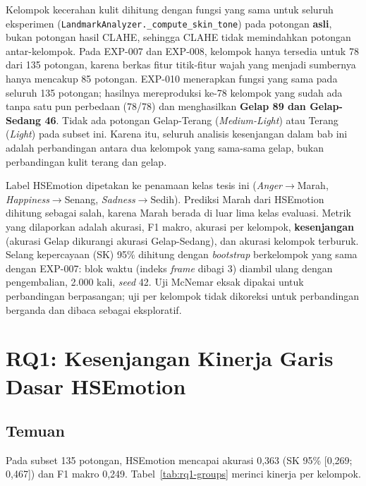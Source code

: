 Kelompok kecerahan kulit dihitung dengan fungsi yang sama untuk seluruh eksperimen (\texttt{LandmarkAnalyzer.\_compute\_skin\_tone}) pada potongan \textbf{asli}, bukan potongan hasil CLAHE, sehingga CLAHE tidak memindahkan potongan antar-kelompok. Pada EXP-007 dan EXP-008, kelompok hanya tersedia untuk 78 dari 135 potongan, karena berkas fitur titik-fitur wajah yang menjadi sumbernya hanya mencakup 85 potongan. EXP-010 menerapkan fungsi yang sama pada seluruh 135 potongan; hasilnya mereproduksi ke-78 kelompok yang sudah ada tanpa satu pun perbedaan (78/78) dan menghasilkan \textbf{Gelap 89 dan Gelap-Sedang 46}. Tidak ada potongan Gelap-Terang (\textit{Medium-Light}) atau Terang (\textit{Light}) pada subset ini. Karena itu, seluruh analisis kesenjangan dalam bab ini adalah perbandingan antara dua kelompok yang sama-sama gelap, bukan perbandingan kulit terang dan gelap.

Label HSEmotion dipetakan ke penamaan kelas tesis ini (\textit{Anger}$\to$Marah, \textit{Happiness}$\to$Senang, \textit{Sadness}$\to$Sedih). Prediksi Marah dari HSEmotion dihitung sebagai salah, karena Marah berada di luar lima kelas evaluasi. Metrik yang dilaporkan adalah akurasi, F1 makro, akurasi per kelompok, \textbf{kesenjangan} (akurasi Gelap dikurangi akurasi Gelap-Sedang), dan akurasi kelompok terburuk. Selang kepercayaan (SK) 95\% dihitung dengan \textit{bootstrap} berkelompok yang sama dengan EXP-007: blok waktu (indeks \textit{frame} dibagi 3) diambil ulang dengan pengembalian, 2.000 kali, \textit{seed} 42. Uji McNemar eksak dipakai untuk perbandingan berpasangan; uji per kelompok tidak dikoreksi untuk perbandingan berganda dan dibaca sebagai eksploratif.

\section{RQ1: Kesenjangan Kinerja Garis Dasar HSEmotion}
\label{sec:rq1-results}

\subsection*{Temuan}

Pada subset 135 potongan, HSEmotion mencapai akurasi 0,363 (SK 95\% [0,269; 0,467]) dan F1 makro 0,249. Tabel~\ref{tab:rq1-groups} merinci kinerja per kelompok.

